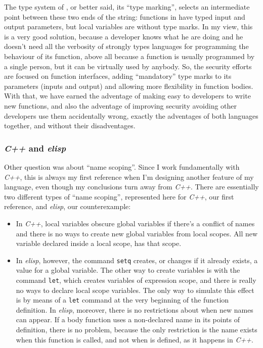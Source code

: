 \documentclass{article}
\begin{document}
The type system of \faupp, or better said, its ``type marking'', selects an
intermediate point between these two ends of the string: functions in \faupp
have typed input and output parameters, but local variables are without type
marks. In my view, this is a very good solution, because a developer knows what
he are doing and he doesn't need all the verbosity of strongly types languages
for programming the behaviour of its function, above all because a function is
usually programmed by a single person, but it can be virtually used by
anybody. So, the security efforts are focused on function interfaces, adding
``mandatory'' type marks to its parameters (inputs and output) and allowing more
flexibility in function bodies. With that, we have earned the adventage of
making easy to developers to write new functions, and also the adventage of
improving security avoiding other developers use them accidentally wrong,
exactly the adventages of both languages together, and without their
disadventages.

\subsubsection{\textit{C++} and \textit{elisp}}
Other question was about ``name scoping''. Since I work fundamentally with
\textit{C++}, this is always my first reference when I'm designing another
feature of my language, even though my conclusions turn away from
\textit{C++}. There are essentially two different types of ``name scoping'',
represented here for \textit{C++}, our first reference, and \textit{elisp}, our
counterexample:

\begin{itemize}
\item In \textit{C++}, local variables obscure global variables if there's a
  conflict of names and there is no ways to create new global variables from
  local scopes. All new variable declared inside a local scope, has that scope.
\item In \textit{elisp}, however, the command \texttt{setq} creates, or changes
  if it already exists, a value for a global variable. The other way to create
  variables is with the command \texttt{let}, which creates variables of
  expression scope, and there is really no ways to declare local scope
  variables. The only way to simulate this effect is by means of a \texttt{let}
  command at the very beginning of the function definition. In \textit{elisp},
  moreover, there is no restrictions about when new names can appear. If a body
  function uses a non-declared name in its points of definition, there is no
  problem, because the only restriction is the name exists when this function
  is called, and not when is defined, as it happens in \textit{C++}.
\end{itemize}
\end{document}
